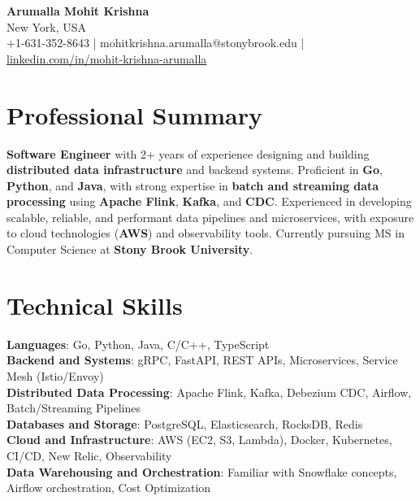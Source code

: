 \documentclass[letterpaper,11pt]{article}
\begin{document}
\begin{center}
  {\Large \textbf{Arumalla Mohit Krishna}} \\
  New York, USA \\
  +1-631-352-8643 \enspace | \enspace mohitkrishna.arumalla@stonybrook.edu \enspace | \enspace \href{https://www.linkedin.com/in/mohit-krishna-arumalla}{linkedin.com/in/mohit-krishna-arumalla}
\end{center}

\section{Professional Summary}
  \begin{itemize}[leftmargin=0.15in, label={}]
    \small{\item{
     \textbf{Software Engineer} with 2+ years of experience designing and building \textbf{distributed data infrastructure} and backend systems. Proficient in \textbf{Go}, \textbf{Python}, and \textbf{Java}, with strong expertise in \textbf{batch and streaming data processing} using \textbf{Apache Flink}, \textbf{Kafka}, and \textbf{CDC}. Experienced in developing scalable, reliable, and performant data pipelines and microservices, with exposure to cloud technologies (\textbf{AWS}) and observability tools. Currently pursuing MS in Computer Science at \textbf{Stony Brook University}.
    }}
  \end{itemize}
\vspace{-16pt}

\section{Technical Skills}
 \begin{itemize}[leftmargin=0.15in, label={}]
    \small{\item{
     \textbf{Languages}: Go, Python, Java, C/C++, TypeScript \\
     \textbf{Backend and Systems}: gRPC, FastAPI, REST APIs, Microservices, Service Mesh (Istio/Envoy) \\
     \textbf{Distributed Data Processing}: Apache Flink, Kafka, Debezium CDC, Airflow, Batch/Streaming Pipelines \\
     \textbf{Databases and Storage}: PostgreSQL, Elasticsearch, RocksDB, Redis \\
     \textbf{Cloud and Infrastructure}: AWS (EC2, S3, Lambda), Docker, Kubernetes, CI/CD, New Relic, Observability \\
     \textbf{Data Warehousing and Orchestration}: Familiar with Snowflake concepts, Airflow orchestration, Cost Optimization
    }}
 \end{itemize}
\vspace{-16pt}
\end{document}
